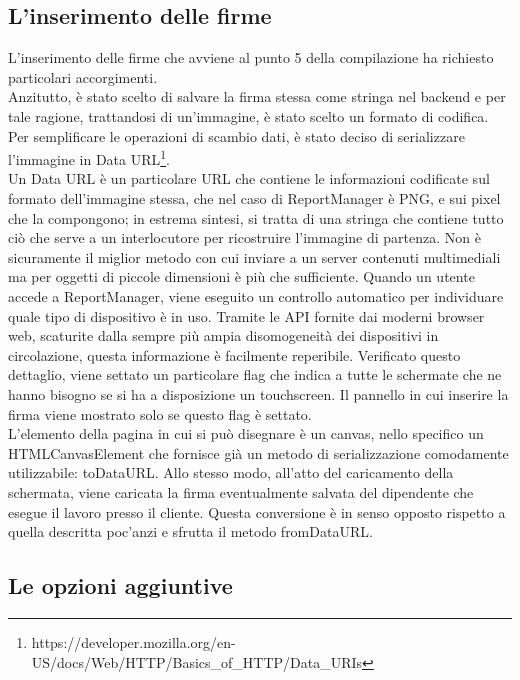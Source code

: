\subsection{L'inserimento delle firme}

L'inserimento delle firme che avviene al punto 5 della compilazione ha richiesto particolari accorgimenti.
\\
Anzitutto, è stato scelto di salvare la firma stessa come stringa nel backend e per tale ragione, trattandosi di un'immagine, è stato scelto un formato di codifica.
Per semplificare le operazioni di scambio dati, è stato deciso di serializzare l'immagine in Data URL\footnote{https://developer.mozilla.org/en-US/docs/Web/HTTP/Basics\_of\_HTTP/Data\_URIs}.
\\
Un Data URL è un particolare URL che contiene le informazioni codificate sul formato dell'immagine stessa, che nel caso di ReportManager è PNG, e sui pixel che la
compongono; in estrema sintesi, si tratta di una stringa che contiene tutto ciò che serve a un interlocutore per ricostruire l'immagine di partenza.
Non è sicuramente il miglior metodo con cui inviare a un server contenuti multimediali ma per oggetti di piccole dimensioni è più che sufficiente.
Quando un utente accede a ReportManager, viene eseguito un controllo automatico per individuare quale tipo di dispositivo è in uso.
Tramite le API fornite dai moderni browser web, scaturite dalla sempre più ampia disomogeneità dei dispositivi in circolazione, questa informazione è facilmente reperibile.
Verificato questo dettaglio, viene settato un particolare flag che indica a tutte le schermate che ne hanno bisogno se si ha a disposizione un touchscreen.
Il pannello in cui inserire la firma viene mostrato solo se questo flag è settato.
\\
L'elemento della pagina in cui si può disegnare è un canvas, nello specifico un HTMLCanvasElement che fornisce già un metodo di serializzazione comodamente utilizzabile: toDataURL.
Allo stesso modo, all'atto del caricamento della schermata, viene caricata la firma eventualmente salvata del dipendente che esegue il lavoro presso il cliente.
Questa conversione è in senso opposto rispetto a quella descritta poc'anzi e sfrutta il metodo fromDataURL.

\subsection{Le opzioni aggiuntive}


